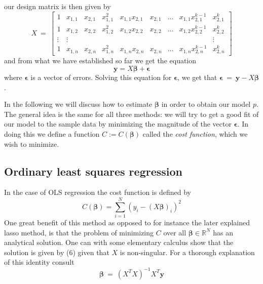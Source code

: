 \documentclass[a4paper,norsk]{article}
\begin{document}
our design matrix is then given by
\begin{equation}
    X \ = \
    \begin{bmatrix}
        1 &x_{1,1} &x_{2,1} &x_{1,1}^2 &x_{1,1}x_{2,1} &x_{2,1} 
        &\dots &x_{1,1}x_{2,1}^{k-1} &x_{2,1}^k \\
        1 &x_{1,2} &x_{2,2} &x_{1,2}^2 &x_{1,2}x_{2,2} &x_{2,2} 
        &\dots &x_{1,2}x_{2,2}^{k-1} &x_{2,2}^k \\
        \vdots &\vdots & & & & & & &\vdots \\
        1 &x_{1,n} &x_{2,n} &x_{1,n}^2 &x_{1,n}x_{2,n} &x_{2,n} 
        &\dots &x_{1,n}x_{2,n}^{k-1} &x_{2,n}^k
    \end{bmatrix}
\end{equation}
and from what we have established so far we get the equation
\begin{equation}
    \bm{y} = X\bm{\beta} + \bm{\epsilon}
\end{equation}
where $\bm{\epsilon}$ is a vector of errors. Solving this equation for 
$\bm{\epsilon}$, we get that 
$\bm{\epsilon} \ = \ \bm{y} - X\bm{\beta}$.
\par
In the following we will discuss how to estimate $\bm{\beta}$ 
in order to obtain our model $p$. The general idea is the same for 
all three methods: 
we will try to get a good fit of our model to the sample data
by minimizing the magnitude of the vector $\bm{\epsilon}$. In doing this 
we define a function $C:=C(\bm{\beta})$ called the 
\textit{cost function}, which we wish to minimize.

\subsection{Ordinary least squares regression}
In the case of OLS regression the cost function is defined by 
\begin{equation}
    C(\bm{\beta}) = \sum_{i=1}^N (y_i - (X\bm{\beta})_i)^2
\end{equation}
One great benefit of this method as opposed to for instance the 
later explained lasso method, is that the problem of minimizing $C$ over
all $\bm{\beta} \in \mathbb{R}^N$ has an analytical solution. 
One can with some elementary calculus show that the solution is 
given by (6) given that $X$ is non-singular. 
For a thorough explanation of this identity consult \cite{hastie}
\begin{equation}
    \bm{\beta} \ = \ (X^TX)^{-1}X^T\bm{y}
\end{equation}
\end{document}
